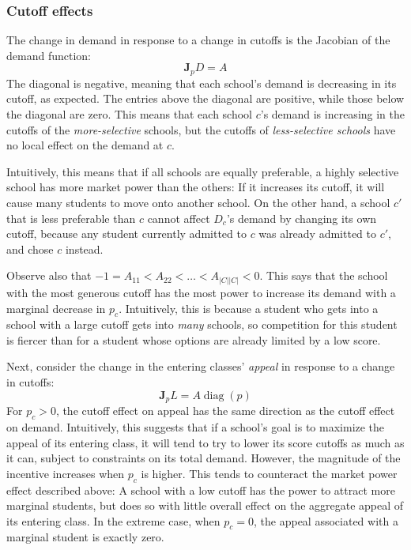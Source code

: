 \documentclass[12pt]{article}
\theoremstyle{definition}
\begin{document}
\subsubsection{Cutoff effects} \label{unconstrainedcutoffeffects}
The change in demand in response to a change in cutoffs is the Jacobian of the demand function:
\[\mathbf{J}_p D = A \]
The diagonal is negative, meaning that each school's demand is decreasing in its cutoff, as expected. The entries above the diagonal are positive, while those below the diagonal are zero. This means that each school $c$'s demand is increasing in the cutoffs of the \emph{more-selective} schools, but the cutoffs of \emph{less-selective schools} have no local effect on the demand at $c$.

Intuitively, this means that if all schools are equally preferable, a highly selective school has more market power than the others: If it increases its cutoff, it will cause many students to move onto another school. On the other hand, a school $c'$ that is less preferable than $c$ cannot affect $D_c$'s demand by changing its own cutoff, because any student currently admitted to $c$ was already admitted to $c'$, and chose $c$ instead. 

Observe also that $-1 = A_{11} < A_{22} < \dots < A_{|C||C|} < 0$. This says that the school with the most generous cutoff has the most power to increase its demand with a marginal decrease in $p_c$. Intuitively, this is because a student who gets into a school with a large cutoff gets into \emph{many} schools, so competition for this student is fiercer than for a student whose options are already limited by a low score. 

Next, consider the change in the entering classes' \emph{appeal} in response to a change in cutoffs:
\[\mathbf{J}_p L = A\operatorname{diag}(p)\]
For $p_c > 0$, the cutoff effect on appeal has the same direction as the cutoff effect on demand. Intuitively, this suggests that if a school's goal is to maximize the appeal of its entering class, it will tend to try to lower its score cutoffs as much as it can, subject to constraints on its total demand. However, the magnitude of the incentive increases when $p_c$ is higher. This tends to counteract the market power effect described above: A school with a low cutoff has the power to attract more marginal students, but does so with little overall effect on the aggregate appeal of its entering class. In the extreme case, when $p_c = 0$, the appeal associated with a marginal student is exactly zero.
\end{document}
